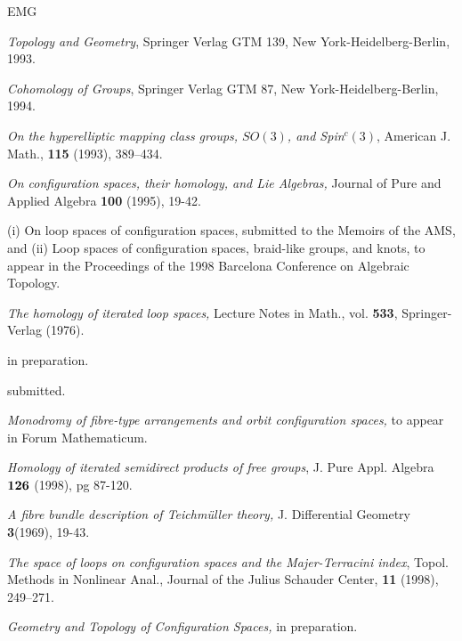 \documentclass{amsart}
\begin{document}
\begin{thebibliography}{EMG}

\textit{Topology and Geometry}, Springer Verlag GTM 139,
New York-Heidelberg-Berlin, 1993.

\textit{Cohomology of Groups}, Springer Verlag GTM 87, 
New York-Heidelberg-Berlin, 1994.



\textit{On the hyperelliptic mapping class groups, 
$SO(3)$, and Spin$^c(3)$}, 
American J. Math., {\bf 115} (1993), 389--434.

\textit{On configuration spaces, their homology, and Lie Algebras,}
Journal of Pure and Applied Algebra {\bf 100} (1995), 19-42.

(i) {On loop spaces of configuration spaces}, submitted to the Memoirs of the
AMS, and (ii) {Loop spaces of configuration spaces, braid-like groups, and
knots}, to appear in the Proceedings of the 1998 Barcelona
Conference on Algebraic Topology.

\textit{The homology of iterated loop spaces,}
Lecture Notes in Math., vol. {\bf 533}, Springer-Verlag (1976).

 in preparation.

 submitted.

\textit{Monodromy of fibre-type arrangements and
orbit configuration spaces,} 
to appear in Forum Mathematicum.

\textit{Homology of iterated semidirect products of free groups},
J. Pure Appl. Algebra $\bf{126}$ (1998), pg 87-120.

\textit{A fibre bundle description of Teichm\"uller theory,} 
J. Differential Geometry {\bf 3}(1969), 19-43.


\textit{The space of loops on configuration spaces and the
Majer-Terracini index}, Topol. Methods in Nonlinear Anal.,
Journal of the Julius Schauder Center, {\bf 11} (1998), 249--271.

\textit{Geometry and Topology of
Configuration Spaces,} in preparation.


\end{thebibliography}
\end{document}
